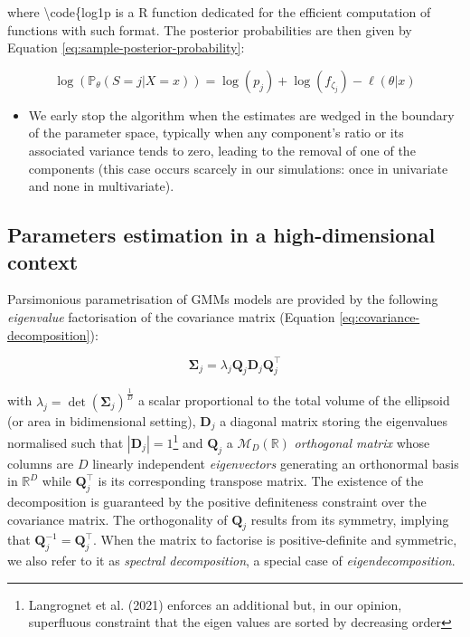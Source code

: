 where \textbackslash code\{log1p is a R function dedicated for the efficient computation of functions with such format. The posterior probabilities are then given by Equation
\eqref{eq:sample-posterior-probability}:

\begin{equation}
\log\left(\mathbb{P}_\theta(S=j | X=x)\right)=\log(p_j) + \log(f_{\zeta_j}) - \ell (\theta |x)
\label{eq:sample-posterior-probability}
\end{equation}

\begin{itemize}
\tightlist
\item
  We early stop the algorithm when the estimates are wedged in the
  boundary of the parameter space, typically when any component's ratio or its associated variance tends to zero, leading to the removal of one of the components (this case occurs scarcely in our simulations: once in univariate and none in multivariate).
\end{itemize}

\hypertarget{parameters-estimation-in-a-high-dimensional-context}{%
\subsection{Parameters estimation in a high-dimensional context}\label{parameters-estimation-in-a-high-dimensional-context}}

Parsimonious parametrisation of GMMs models are provided by the following \emph{eigenvalue} factorisation of the covariance matrix (Equation \eqref{eq:covariance-decomposition}):

\begin{equation}
    \boldsymbol{\Sigma}_j=\lambda_j \boldsymbol{Q}_j \boldsymbol{D}_j \boldsymbol{Q}_j^\top
    \label{eq:covariance-decomposition}
\end{equation}

with \(\lambda_j=\operatorname{det}\left( \boldsymbol{\Sigma}_j\right)^{\frac{1}{D}}\) a scalar proportional to the total volume of the ellipsoid (or area in bidimensional setting), \(\boldsymbol{D}_j\) a diagonal matrix storing the eigenvalues normalised such that \(|\boldsymbol{D}_j|=1\)\footnote{Langrognet et al. (2021) enforces an additional but, in our opinion, superfluous constraint that the eigen values are sorted by decreasing order} and \(\boldsymbol{Q}_j\) a \(\mathcal{M}_D(\mathbb{R})\) \emph{orthogonal matrix} whose
columns are \(D\) linearly independent \emph{eigenvectors} generating an orthonormal basis in \(\mathbb{R}^D\) while \(\boldsymbol{Q}_j^\top\) is its corresponding transpose matrix. The existence of the decomposition is guaranteed by the positive definiteness constraint over the covariance matrix. The orthogonality of \(\boldsymbol{Q}_j\) results from its symmetry, implying that \(\boldsymbol{Q}_j^{-1}=\boldsymbol{Q}_j^\top\). When the matrix to factorise is positive-definite and symmetric, we also refer to it as \emph{spectral decomposition}, a special case of \emph{eigendecomposition}.

